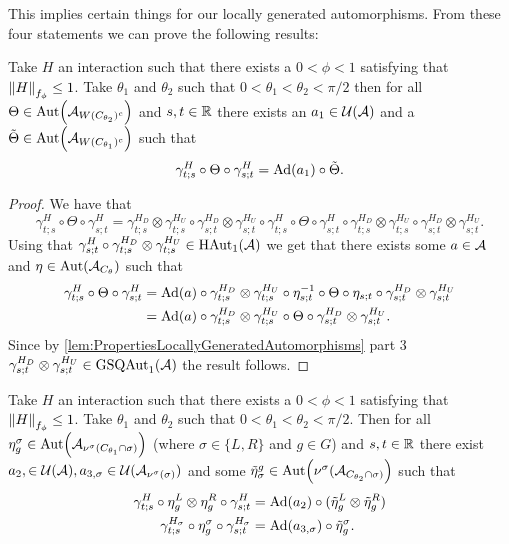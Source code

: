 \documentclass[11pt,a4paper,twoside]{article}
\numberwithin{equation}{section}
\begin{document}
	This implies certain things for our locally generated automorphisms. From these four statements we can prove the following results:
	\begin{lemma}\label{lem:TwoAngleLemmaPart1}
		Take $H$ an interaction such that there exists a $0<\phi<1$ satisfying that $\norm{H}_{f_\phi}\leq 1$. Take $\theta_1$ and $\theta_2$ such that $0<\theta_1<\theta_2<\pi/2$ then for all $\Theta\in\Aut{\AA_{W(C_{\theta_2})^c}}$ and $s,t\in\RR$ there exists an $a_1\in\UU(\AA)$ and a $\tilde{\Theta}\in \Aut{\AA_{W(C_{\theta_1})^c}}$ such that
		\begin{equation}\label{eq:TwoAngleLemmaPart1Equation1}
			\gamma^{H}_{t;s}\circ\Theta\circ\gamma^{H}_{s;t}=\Ad{a_1}\circ\tilde{\Theta}.
		\end{equation}
	\end{lemma}
	\begin{proof}
		We have that
		\begin{equation}
			\gamma^{H}_{t;s}\circ\Theta\circ\gamma^{H}_{s;t}=\gamma^{H_D}_{t;s}\otimes\gamma^{H_U}_{t;s}\circ\gamma^{H_D}_{s;t}\otimes\gamma^{H_U}_{s;t}\circ\gamma^{H}_{t;s}\circ\Theta\circ\gamma^{H}_{s;t}\circ\gamma^{H_D}_{t;s}\otimes\gamma^{H_U}_{t;s}\circ\gamma^{H_D}_{s;t}\otimes\gamma^{H_U}_{s;t}.
		\end{equation}
		Using that $\gamma^{H}_{s;t}\circ\gamma^{H_D}_{t;s}\otimes\gamma^{H_U}_{t;s}\in\textrm{HAut}_1(\AA)$ we get that there exists some $a\in\AA$ and $\eta\in\Aut{\AA_{C_\theta}}$ such that
		\begin{align}
			\gamma^{H}_{t;s}\circ\Theta\circ\gamma^{H}_{s;t}&=\Ad{a}\circ \gamma^{H_D}_{t;s}\otimes\gamma^{H_U}_{t;s}\circ\eta_{s;t}^{-1}\circ\Theta\circ\eta_{s;t}\circ\gamma^{H_D}_{s;t}\otimes\gamma^{H_U}_{s;t}\\
			&=\Ad{a}\circ \gamma^{H_D}_{t;s}\otimes\gamma^{H_U}_{t;s}\circ\Theta\circ\gamma^{H_D}_{s;t}\otimes\gamma^{H_U}_{s;t}.
		\end{align}
		Since by \ref{lem:PropertiesLocallyGeneratedAutomorphisms} part 3 $\gamma^{H_D}_{s;t}\otimes\gamma^{H_U}_{s;t}\in\textrm{GSQAut}_1(\AA)$ the result follows.
	\end{proof}
	\begin{lemma}\label{lem:TwoAngleLemmaPart2}
		Take $H$ an interaction such that there exists a $0<\phi<1$ satisfying that $\norm{H}_{f_\phi}\leq 1$. Take $\theta_1$ and $\theta_2$ such that $0<\theta_1<\theta_2<\pi/2$. Then for all $\eta_{g}^{\sigma}\in\Aut{\AA_{\nu^{\sigma}(C_{\theta_1}\cap\sigma)}}$ (where $\sigma\in\{L,R\}$ and $g\in G$) and $s,t\in\RR$ there exist $a_{2},\in\UU(\AA),a_{3,\sigma}\in\UU(\AA_{\nu^{\sigma}(\sigma)})$ and some $\tilde{\eta}_{\sigma}^g\in \Aut{\nu^{\sigma}(\AA_{C_{\theta_2}\cap\sigma)}}$ such that
		\begin{align}
			\label{eq:TwoAngleLemmaPart2Equation1}
			\gamma^{H}_{t;s}\circ\eta_{g}^L\otimes\eta_{g}^R\circ\gamma^{H}_{s;t}&=\Ad{a_2}\circ(\tilde\eta_{g}^L \otimes\tilde\eta_{g}^R)\\
			\label{eq:TwoAngleLemmaPart2Equation2}
			\gamma^{H_\sigma}_{t;s}\circ\eta_g^\sigma\circ\gamma^{H_\sigma}_{s;t}&=\Ad{a_{3,\sigma}}\circ \tilde\eta_{g}^\sigma.
		\end{align}
	\end{lemma}
\end{document}

